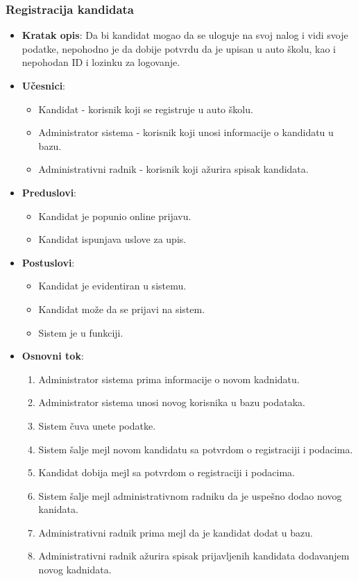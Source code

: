 \subsubsection{Registracija kandidata}
\label{subsubsec:registracija}
\begin{itemize}
  \item \textbf{Kratak opis}: Da bi kandidat mogao da se uloguje na svoj nalog i vidi svoje podatke, 
  nepohodno je da dobije potvrdu da je upisan u auto školu, kao i nepohodan ID i lozinku za logovanje.
  \item \textbf{Učesnici}:
  \begin{itemize}
    \item Kandidat - korisnik koji se registruje u auto školu.
    \item Administrator sistema - korisnik koji unosi informacije o kandidatu u bazu.
    \item Administrativni radnik - korisnik koji ažurira spisak kandidata.
  \end{itemize}
  \item \textbf{Preduslovi}:
    \begin{itemize}
    \item  Kandidat je popunio online prijavu.
    \item  Kandidat ispunjava uslove za upis.
    \end{itemize}
  \item \textbf{Postuslovi}:
      \begin{itemize}
      \item Kandidat je evidentiran u sistemu.
      \item Kandidat može da se prijavi na sistem.
      \item Sistem je u funkciji.
      \end{itemize}
  \item \textbf{Osnovni tok}:
      \begin{enumerate}
        \item Administrator sistema prima informacije o novom kadnidatu.
        \item Administrator sistema unosi novog korisnika u bazu podataka.
        \item Sistem čuva unete podatke.
        \item Sistem šalje mejl novom kandidatu sa potvrdom o registraciji i podacima.
        \item Kandidat dobija mejl sa potvrdom o registraciji i podacima.
        \item Sistem šalje mejl administrativnom radniku da je uspešno dodao novog kanidata.
        \item Administrativni radnik prima mejl da je kandidat dodat u bazu.
        \item Administrativni radnik ažurira spisak prijavljenih kandidata dodavanjem novog kadnidata.    
      \end{enumerate} 


\end{itemize}
